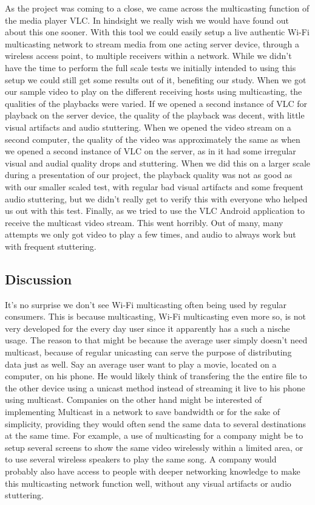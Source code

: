\documentclass[9pt,a4paper]{acmproc}
\begin{document}
As the project was coming to a close, we came across the multicasting function of the media player VLC. In hindsight we really wish we would have found out about this one sooner. With this tool we could easily setup a live authentic Wi-Fi multicasting network to stream media from one acting server device, through a wireless access point, to multiple receivers within a network. While we didn’t have the time to perform the full scale tests we initially intended to using this setup we could still get some results out of it, benefiting our study.
When we got our sample video to play on the different receiving hosts using multicasting, the qualities of the playbacks were varied. If we opened a second instance of VLC for playback on the server device, the quality of the playback was decent, with little visual artifacts and audio stuttering. When we opened the video stream on a second computer, the quality of the video was approximately the same as when we opened a second instance of VLC on the server, as in it had some irregular visual and audial quality drops and stuttering. When we did this on a larger scale during a presentation of our project, the playback quality was not as good as with our smaller scaled test, with regular bad visual artifacts and some frequent audio stuttering, but we didn’t really get to verify this with everyone who helped us out with this test. Finally, as we tried to use the VLC Android application to receive the multicast video stream. This went horribly. Out of many, many attempts we only got video to play a few times, and audio to always work but with frequent stuttering.

\subsection{Discussion}
It’s no surprise we don’t see Wi-Fi multicasting often being used by regular consumers. This is because multicasting, Wi-Fi multicasting even more so, is not very developed for the every day user since it apparently has a such a nische usage. The reason to that might be because the average user simply doesn't need multicast, because of regular unicasting can serve the purpose of distributing data just as well. Say an average user want to play a movie, located on a computer, on his phone. He would likely think of transfering the the entire file to the other device using a unicast method instead of streaming it live to his phone using multicast.
Companies on the other hand might be interested of implementing Multicast in a network to save bandwidth or for the sake of simplicity, providing they would often send the same data to several destinations at the same time. For example, a use of multicasting for a company might be to setup several screens to show the same video wirelessly within a limited area, or to use several wireless speakers to play the same song. A company would probably also have access to people with deeper networking knowledge to make this multicasting network function well, without any visual artifacts or audio stuttering.
\end{document}

